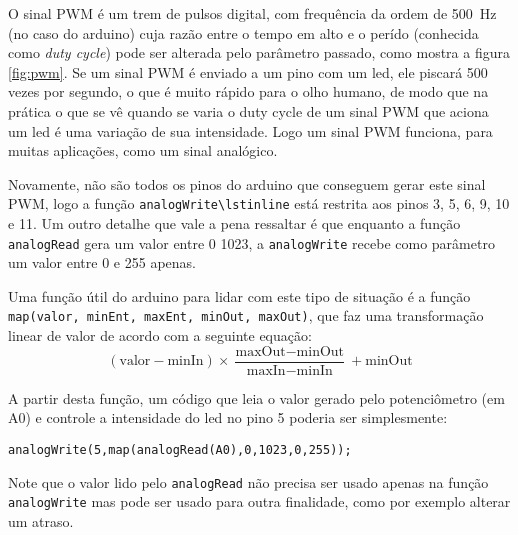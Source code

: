 O sinal PWM é um trem de pulsos digital, com frequência da ordem de \SI{500}{Hz} (no caso do arduino) cuja razão entre o tempo em alto e o perído (conhecida como \emph{duty cycle}) pode ser alterada pelo parâmetro passado, como mostra a figura \ref{fig:pwm}.
 Se um sinal PWM é enviado a um pino com um led, ele piscará 500 vezes por segundo, o que é muito rápido para o olho humano, de modo que na prática o que se vê quando se varia o duty cycle de um sinal PWM que aciona um led é uma variação de sua intensidade. Logo um sinal PWM funciona, para muitas aplicações, como um sinal analógico.

Novamente, não são todos os pinos do arduino que conseguem gerar este sinal PWM, logo a função \lstinline|analogWrite\lstinline| está restrita aos pinos 3, 5, 6, 9, 10 e 11. Um outro detalhe que vale a pena ressaltar é que enquanto a função \lstinline|analogRead| gera um valor entre 0  1023, a \lstinline|analogWrite| recebe como parâmetro um valor entre 0 e 255 apenas.

Uma função útil do arduino para lidar com este tipo de situação é a função \lstinline|map(valor, minEnt, maxEnt, minOut, maxOut)|, que faz uma transformação linear de valor de acordo com a seguinte equação:
\begin{equation*}
(\text{valor} - \text{minIn}) \times \frac{\text{maxOut} - \text{minOut}}{\text{maxIn} - \text{minIn}} + \text{minOut}
\end{equation*}

A partir desta função, um código que leia o valor gerado pelo potenciômetro (em A0) e controle a intensidade do led no pino 5 poderia ser simplesmente:
\begin{lstlisting}
analogWrite(5,map(analogRead(A0),0,1023,0,255));
\end{lstlisting}

Note que o valor lido pelo \lstinline|analogRead| não precisa ser usado apenas na função \lstinline|analogWrite| mas pode ser usado para outra finalidade, como por exemplo alterar um atraso.
  
